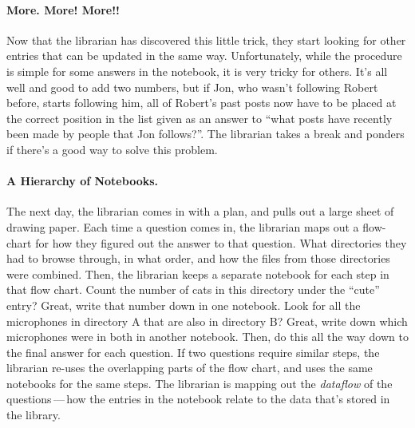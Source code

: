 \paragraph{More. More! More!!}
%
Now that the librarian has discovered this little trick, they start looking for
other entries that can be updated in the same way. Unfortunately, while the
procedure is simple for some answers in the notebook, it is very tricky for
others. It's all well and good to add two numbers, but if Jon, who wasn't
following Robert before, starts following him, all of Robert's past posts now
have to be placed at the correct position in the list given as an answer to
``what posts have recently been made by people that Jon follows?''. The
librarian takes a break and ponders if there's a good way to solve this problem.

\paragraph{A Hierarchy of Notebooks.}
%
The next day, the librarian comes in with a plan, and pulls out a large sheet of
drawing paper. Each time a question comes in, the librarian maps out a
flow-chart for how they figured out the answer to that question. What
directories they had to browse through, in what order, and how the files from
those directories were combined. Then, the librarian keeps a separate notebook
for each step in that flow chart. Count the number of cats in this directory
under the ``cute'' entry? Great, write that number down in one notebook. Look
for all the microphones in directory A that are also in directory B? Great,
write down which microphones were in both in another notebook. Then, do this all
the way down to the final answer for each question. If two questions require
similar steps, the librarian re-uses the overlapping parts of the flow chart,
and uses the same notebooks for the same steps. The librarian is mapping out the
\textit{dataflow} of the questions\,---\,how the entries in the notebook relate
to the data that's stored in the library.

